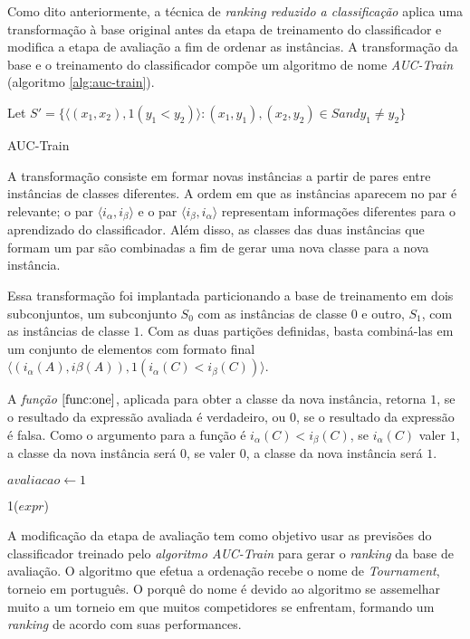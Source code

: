 Como dito anteriormente, a técnica de \emph{ranking reduzido a classificação} aplica uma transformação à base original antes da etapa de treinamento do classificador e modifica a etapa de avaliação a fim de ordenar as instâncias. A transformação da base e o treinamento do classificador compõe um algoritmo de nome \emph{AUC-Train} (algoritmo \ref{alg:auc-train}).

\begin{algorithm}[H]
    Let $S' = \{\langle (x_1, x_2), 1(y_1 < y_2) \rangle : (x_1, y_1), (x_2, y_2) \in S and y_1 \neq y_2\}$\;
    
    \caption{AUC-Train}
    \label{alg:auc-train}
\end{algorithm}

A transformação consiste em formar novas instâncias a partir de pares entre instâncias de classes diferentes. A ordem em que as instâncias aparecem no par é relevante; o par $\langle i_{\alpha}, i_{\beta} \rangle$ e o par $\langle i_{\beta}, i_{\alpha} \rangle$ representam informações diferentes para o aprendizado do classificador. Além disso, as classes das duas instâncias que formam um par são combinadas a fim de gerar uma nova classe para a nova instância.

Essa transformação foi implantada particionando a base de treinamento em dois subconjuntos, um subconjunto $S_0$ com as instâncias de classe $0$ e outro, $S_1$, com as instâncias de classe $1$. Com as duas partições definidas, basta combiná-las em um conjunto de elementos com formato final $\langle (i_{\alpha}(A), i{\beta}(A)), 1(i_{\alpha}(C) < i_{\beta}(C)) \rangle$.

A \emph{função $\ref{func:one}$}, aplicada para obter a classe da nova instância, retorna $1$, se o resultado da expressão avaliada é verdadeiro, ou $0$, se o resultado da expressão é falsa. Como o argumento para a função é $i_{\alpha}(C) < i_{\beta}(C)$, se $i_{\alpha}(C)$ valer $1$, a classe da nova instância será $0$, se valer $0$, a classe da nova instância será $1$.

\begin{function}[h]
    $avaliacao \gets 1$



    \caption{1($expr$)}
    \label{func:one}
\end{function}

A modificação da etapa de avaliação tem como objetivo usar as previsões do classificador treinado pelo \emph{algoritmo \emph{AUC-Train}} para gerar o \emph{ranking} da base de avaliação. O algoritmo que efetua a ordenação recebe o nome de \emph{Tournament}, torneio em português. O porquê do nome é devido ao algoritmo se assemelhar muito a um torneio em que muitos competidores se enfrentam, formando um \emph{ranking} de acordo com suas performances.

